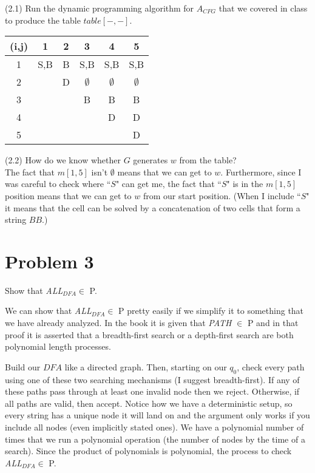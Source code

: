 \documentclass[11pt]{article}
\begin{document}
\noindent
(2.1) Run the dynamic programming algorithm for $A_{CFG}$ that we covered in class to produce the table $table[-,-]$.
\newline

\begin{center}
\begin{tabular}{c|c|c|c|c|c|} 
    (i,j)  & 1 & 2 & 3 & 4 & 5 \\ \hline
    1 & S,B & B & S,B & S,B & S,B \\ \hline
    2 & \cellcolor{gray} & D & $\emptyset$ & $\emptyset$ & $\emptyset$ \\ \hline
    3 & \cellcolor{gray} & \cellcolor{gray} & B & B & B\\ \hline
    4 & \cellcolor{gray} & \cellcolor{gray} & \cellcolor{gray} & D & D\\ \hline
    5 & \cellcolor{gray} & \cellcolor{gray} & \cellcolor{gray} & \cellcolor{gray} & D\\ \hline
\end{tabular}
\end{center}

\noindent
(2.2) How do we know whether $G$ generates $w$ from the table?\\

The fact that $m[1,5]$ isn't $\emptyset$ means that we can get to $w$. Furthermore, since I was careful to check where ``$S$" can get me, the fact that ``$S$" is in the $m[1,5]$ position means that we can get to $w$ from our start position. (When I include ``$S$" it means that the cell can be solved by a concatenation of two cells that form a string $BB$.)  


\newpage


\section*{Problem 3}

Show that {\em ALL}$_{DFA}\in$ P.

We can show that {\em ALL}$_{DFA}\in$ P pretty easily if we simplify it to something that we have already analyzed. In the book it is given that {\em PATH} $\in$ P and in that proof it is asserted that a breadth-first search or a depth-first search are both polynomial length processes. 

Build our $DFA$ like a directed graph. Then, starting on our $q_0$, check every path using one of these two searching mechanisms (I suggest breadth-first). If any of these paths pass through at least one invalid node then we reject. Otherwise, if all paths are valid, then accept. Notice how we have a deterministic setup, so every string has a unique node it will land on and the argument only works if you include all nodes (even implicitly stated ones). We have a polynomial number of times that we run a polynomial operation (the number of nodes by the time of a search). Since the product of polynomials is polynomial, the process to check {\em ALL}$_{DFA}\in$ P. 
\end{document}
